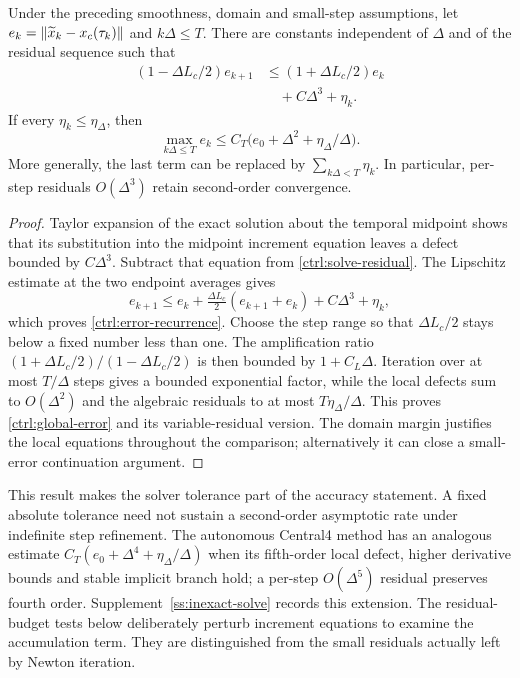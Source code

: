 \begin{proposition}
\label{ctrl:convergence}
Under the preceding smoothness, domain and small-step assumptions, let
$e_k=\left\lVert\widetilde x_k-x_c(\tau_k)\right\rVert$ and $k\Delta\le T$. There are constants independent of $\Delta$ and of the residual sequence such that
\begin{equation}\label{ctrl:error-recurrence}
\begin{aligned}
 (1-\Delta L_c/2)e_{k+1}
 &\le(1+\Delta L_c/2)e_k\\
 &\quad+C\Delta^3+\eta_k.
\end{aligned}
\end{equation}
If every $\eta_k\le\eta_\Delta$, then
\begin{equation}\label{ctrl:global-error}
 \max_{k\Delta\le T}e_k
 \le C_T\bigl(e_0+\Delta^2+\eta_\Delta/\Delta\bigr).
\end{equation}
More generally, the last term can be replaced by
$\sum_{k\Delta<T}\eta_k$. In particular, per-step residuals
$O(\Delta^3)$ retain second-order convergence.
\end{proposition}

\begin{proof}
Taylor expansion of the exact solution about the temporal midpoint shows that its substitution into the midpoint increment equation leaves a defect bounded by $C\Delta^3$. Subtract that equation from \eqref{ctrl:solve-residual}. The Lipschitz estimate at the two endpoint averages gives
\[
 e_{k+1}\le e_k+\tfrac{\Delta L_c}{2}(e_{k+1}+e_k)
                              +C\Delta^3+\eta_k,
\]
which proves \eqref{ctrl:error-recurrence}. Choose the step range so that $\Delta L_c/2$ stays below a fixed number less than one. The amplification ratio
$(1+\Delta L_c/2)/(1-\Delta L_c/2)$ is then bounded by $1+C_L\Delta$. Iteration over at most $T/\Delta$ steps gives a bounded exponential factor, while the local defects sum to $O(\Delta^2)$ and the algebraic residuals to at most $T\eta_\Delta/\Delta$. This proves \eqref{ctrl:global-error} and its variable-residual version. The domain margin justifies the local equations throughout the comparison; alternatively it can close a small-error continuation argument.
\end{proof}

This result makes the solver tolerance part of the accuracy statement. A fixed absolute tolerance need not sustain a second-order asymptotic rate under indefinite step refinement. The autonomous Central4 method has an analogous estimate
$C_T(e_0+\Delta^4+\eta_\Delta/\Delta)$ when its fifth-order local defect, higher derivative bounds and stable implicit branch hold; a per-step $O(\Delta^5)$ residual preserves fourth order. Supplement~\ref{ss:inexact-solve} records this extension. The residual-budget tests below deliberately perturb increment equations to examine the accumulation term. They are distinguished from the small residuals actually left by Newton iteration.

